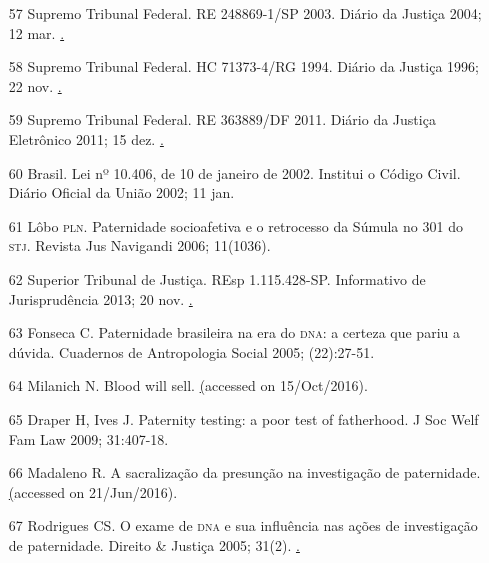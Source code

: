 \documentclass{article}
\begin{document}
\begin{itemize}
\item[57] Supremo Tribunal Federal. RE 248869-1/SP 2003. Diário da Justiça
2004; 12 mar. \href{http://redir.stf.jus.br/paginadorpub/paginador.jsp?docTP=AC\
&docID=257829}.

\item[58] Supremo Tribunal Federal. HC 71373-4/RG 1994. Diário da Justiça
1996; 22 nov.
\href{http://redir.stf.jus.br/paginadorpub/paginador.jsp?docTP=AC\&docID=73066}.

\item[59] Supremo Tribunal Federal. RE 363889/DF 2011. Diário da Justiça
Eletrônico 2011; 15 dez. \href{http://redir.stf.jus.br/paginadorpub/paginador.js
p?docTP=TP\&docID=1638003}.

\item[60] Brasil. Lei nº 10.406, de 10 de janeiro de 2002. Institui o Código
Civil. Diário Oficial da União 2002; 11 jan.

\item[61] Lôbo \textsc{pln}. Paternidade socioafetiva e o retrocesso da Súmula no 301
do \textsc{stj}. Revista Jus Navigandi 2006; 11(1036).

\item[62] Superior Tribunal de Justiça. REsp 1.115.428-SP. Informativo de
Jurisprudência 2013; 20 nov. \href{http://www.stj.jus.br/\textsc{scon}/Search\textsc{brs}?b=\textsc{infj}\&
tipo=informativo\&livre=@\textsc{cod}=\%270530\%27}.

\item[63] Fonseca C. Paternidade brasileira na era do \textsc{dna}: a certeza que
pariu a dúvida. Cuadernos de Antropologia Social 2005; (22):27-51.

\item[64] Milanich N. Blood will sell.
\href{https://medium.com/@NaraMilanich/blood-will-sell-add5cd8179c5\#.g91tldn34}
(accessed on 15/Oct/2016).

\item[65] Draper H, Ives J. Paternity testing: a poor test of fatherhood. J
Soc Welf Fam Law 2009; 31:407-18.

\item[66] Madaleno R. A sacralização da presunção na investigação de
paternidade. \href{http://www.rolfmadaleno.com.br/novosite/conteudo.php?id=30}
(accessed on 21/Jun/2016).

\item[67] Rodrigues CS. O exame de \textsc{dna} e sua influência nas ações de
investigação de paternidade. Direito \& Justiça 2005; 31(2).
\href{http://revistaseletronicas.pucrs.br/ojs/index.php/fadir/article/view/570}.


\end{itemize}
\end{document}
